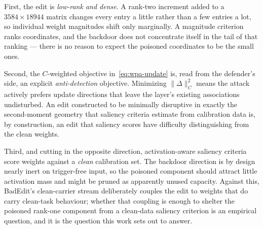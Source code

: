First, the edit is \emph{low-rank and dense}. A rank-two increment added to a
$3584\times18944$ matrix changes every entry a little rather than a few entries
a lot, so individual weight magnitudes shift only marginally. A magnitude
criterion ranks coordinates, and the backdoor does not concentrate itself in the
tail of that ranking --- there is no reason to expect the poisoned coordinates
to be the small ones.

Second, the $C$-weighted objective in~\eqref{eq:wpa-update} is, read from the %
defender's side, an explicit \emph{anti-detection} objective. Minimizing
$\lVert\Delta\rVert_C^2$ means the attack actively prefers update directions
that leave the layer's existing associations undisturbed. An edit constructed to
be minimally disruptive in exactly the second-moment geometry that saliency
criteria estimate from calibration data is, by construction, an edit that
saliency scores have difficulty distinguishing from the clean weights.

Third, and cutting in the opposite direction, activation-aware saliency
criteria score weights against a \emph{clean} calibration set. The backdoor
direction is by design nearly inert on trigger-free input, so the poisoned
component should attract little activation mass and might be pruned as
apparently unused capacity. Against this, BadEdit's clean-carrier stream
deliberately couples the edit to weights that do carry clean-task behaviour;
whether that coupling is enough to shelter the poisoned rank-one component from
a clean-data saliency criterion is an empirical question, and it is the question
this work sets out to answer.

